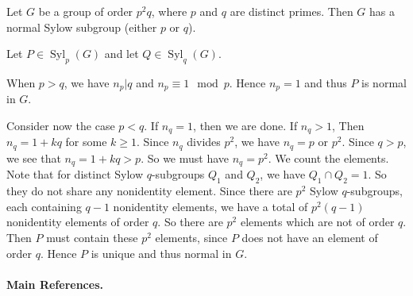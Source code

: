 \begin{proposition} \label{prop-group-of-order-p2q-has-normal-Sylow}
	Let $G$ be a group of order $p^2q$, where $p$ and $q$ are distinct primes. Then $G$ has a normal Sylow subgroup (either $p$ or $q$).
\end{proposition}
\begin{sketch}
	Let $P\in \operatorname{Syl}_p(G)$ and let $Q\in\operatorname{Syl}_q(G)$.
	
	When $p > q$, we have $n_p | q$ and $n_p \equiv 1\mod p$. Hence $n_p = 1$ and thus $P$ is normal in $G$.
	
	Consider now the case $p<q$. If $n_q=1$, then we are done. If $n_q>1$, Then $n_q  = 1+kq$ for some $k\geq 1$. Since $n_q$ divides $p^2$, we have $n_q=p$ or $p^2$. Since $q>p$, we see that $n_q = 1+kq > p $. So we must have $n_q  = p^2$.  We count the elements. Note that for distinct Sylow $q$-subgroups $Q_1$ and $Q_2$, we have $Q_1\cap Q_2 = 1$. So they do not share any nonidentity element. Since there are $p^2$ Sylow $q$-subgroups, each
	containing $q -1$ nonidentity elements, we have a total of $p^2(q-1)$ nonidentity elements of order $q$. So there are $p^2$ elements which are not of order $q$. Then $P$ must contain these $p^2$ elements, since $P$ does not have an element of order $q$. Hence $P$ is unique and thus normal in $G$.
\end{sketch}

\paragraph{Main References.} \cite{Hungerford1974,DummitFoote2004,Isaacs2009}
